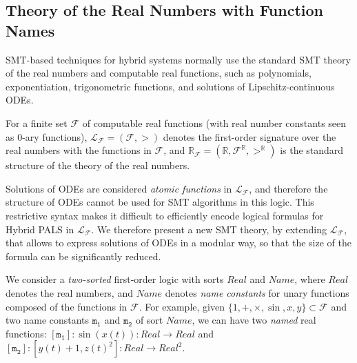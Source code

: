 %


\subsection{Theory of the Real Numbers with Function Names}

SMT-based techniques for hybrid systems
normally use the standard SMT theory of the real numbers and computable %
real functions,
such as polynomials, exponentiation, trigonometric functions,  
and solutions of Lipschitz-continuous ODEs.

\begin{definition}
For a finite set $\mathcal{F}$ of computable real functions
(with real number constants seen as $0$-ary functions),
%
$\mathcal{L}_\mathcal{F} = (\mathcal{F}, >)$ denotes the first-order signature over the real numbers
with the functions in $\mathcal{F}$,
and $\mathbb{R}_\mathcal{F} = (\mathbb{R}, \mathcal{F}^\mathbb{R}, >^\mathbb{R})$
is the standard structure of the theory of the real numbers.
\end{definition}


Solutions of ODEs are considered  \emph{atomic functions} in $\mathcal{L}_\mathcal{F}$,
and therefore the structure of ODEs cannot be used for SMT algorithms  in this logic.
This restrictive syntax makes it difficult to efficiently encode  logical formulas for Hybrid PALS 
in $\mathcal{L}_\mathcal{F}$. 
We therefore present a new SMT theory,
by extending $\mathcal{L}_\mathcal{F}$, that allows  to express solutions of ODEs in a modular way,
so that the size of the formula can be significantly reduced.


We consider a \emph{two-sorted} first-order logic with sorts $\mathit{Real}$ and $\mathit{Name}$,
where $\mathit{Real}$ denotes the real numbers,
and $\mathit{Name}$ denotes \emph{name constants} 
for unary functions composed of the functions in $\mathcal{F}$.
For example, given $\{1, +, \times, \sin, x, y\} \subset \mathcal{F}$
and two name constants $\mathtt{m_1}$ and $\mathtt{m_2}$ of sort $\mathit{Name}$,
we can have two \emph{named} %
real functions:
$[\mathtt{m_1}]: %
\sin(x(t)) :\mathit{Real} \to \mathit{Real}$
and
$[\mathtt{m_2}]: %
[y(t) + 1, z(t)^2] :  \mathit{Real} \to \mathit{Real}^2$.


